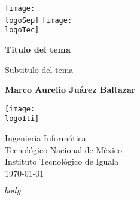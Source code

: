 \documentclass[a4paper, 12pt]{article}
\def\logoIti{~/Documents/TEC/Logos/itiguala.png}
\def\logoTec{~/Documents/TEC/Logos/tecnm.jpg}
\def\logoSep{~/Documents/TEC/Logos/sep.png}
\begin{document}
\begin{titlepage}
 \begin{center}
	 \texttt{[image: \\logoSep]}
	 \hspace{1in}
	 \texttt{[image: \\logoTec]}
	 \vspace*{1in}

	 \large{\textbf{Titulo del tema}}

	 \vspace{0.5cm}
	 Subtitulo del tema
				
	 \vspace{1.5cm}

	 \textbf{Marco Aurelio Juárez Baltazar}

	 \vspace{1.45in}
	 \texttt{[image: \\logoIti]}
	 \vspace{1.45in}

	 Ingeniería Informática\\\vspace{0.2cm}
	 Tecnológico Nacional de México\\\vspace{0.2cm}
	 Instituto Tecnológico de Iguala\\\vspace{0.2cm}
	 \vspace{1cm}
	 \today
 \end{center}
\end{titlepage}

\thispagestyle{empty}
\tableofcontents

\newpage
\setcounter{page}{1}

$body$
\end{document}
